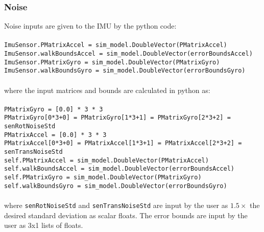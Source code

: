 \documentclass[]{BasiliskReportMemo}
\begin{document}
\subsubsection{Noise}
Noise inputs are given to the IMU by the python code:\\\\
\verb|ImuSensor.PMatrixAccel = sim_model.DoubleVector(PMatrixAccel)|\\
\verb|ImuSensor.walkBoundsAccel = sim_model.DoubleVector(errorBoundsAccel)|\\
\verb|ImuSensor.PMatrixGyro = sim_model.DoubleVector(PMatrixGyro)|\\
\verb|ImuSensor.walkBoundsGyro = sim_model.DoubleVector(errorBoundsGyro)|\\\\
where the input matrices and bounds are calculated in python as:\\\\
\verb|PMatrixGyro = [0.0] * 3 * 3|\\
\verb|PMatrixGyro[0*3+0] = PMatrixGyro[1*3+1] = PMatrixGyro[2*3+2] = senRotNoiseStd|\\
\verb|PMatrixAccel = [0.0] * 3 * 3|\\
\verb|PMatrixAccel[0*3+0] = PMatrixAccel[1*3+1] = PMatrixAccel[2*3+2] = senTransNoiseStd|\\
\verb|self.PMatrixAccel = sim_model.DoubleVector(PMatrixAccel)|\\
\verb|self.walkBoundsAccel = sim_model.DoubleVector(errorBoundsAccel)|\\
\verb|self.PMatrixGyro = sim_model.DoubleVector(PMatrixGyro)|\\
\verb|self.walkBoundsGyro = sim_model.DoubleVector(errorBoundsGyro)|\\\\
where \verb|senRotNoiseStd| and \verb|senTransNoiseStd| are input by the user as $\bm{1.5 \times}$ the desired standard deviation as scalar floats. The error bounds are input by the user as 3x1 lists of floats.
\end{document}
